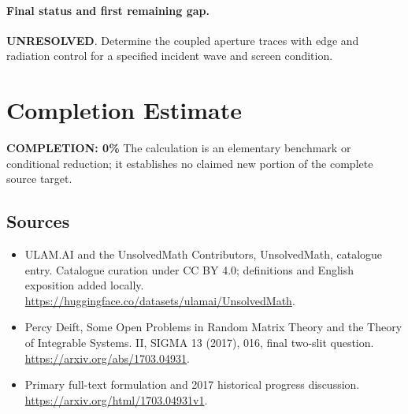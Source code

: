 \documentclass[11pt]{article}
\begin{document}
\paragraph{Final status and first remaining gap.}
\textbf{UNRESOLVED}. Determine the coupled aperture traces with edge and radiation control for a specified incident wave and screen condition.

\section{Completion Estimate}
\noindent\textbf{COMPLETION: 0\%}
The calculation is an elementary benchmark or conditional reduction; it establishes no claimed new portion of the complete source target.

\subsection{Sources}
\begin{itemize}
\item[\hypertarget{source:statement:1}{S1}] ULAM.AI and the UnsolvedMath Contributors, UnsolvedMath, catalogue entry. Catalogue curation under CC BY 4.0; definitions and English exposition added locally.
\url{https://huggingface.co/datasets/ulamai/UnsolvedMath}.
\item[\hypertarget{source:statement:2}{S2}] Percy Deift, Some Open Problems in Random Matrix Theory and the Theory of Integrable Systems. II, SIGMA 13 (2017), 016, final two-slit question.
\url{https://arxiv.org/abs/1703.04931}.
\item[\hypertarget{source:statement:3}{S3}] Primary full-text formulation and 2017 historical progress discussion.
\url{https://arxiv.org/html/1703.04931v1}.
\end{itemize}
\label{end:statement}
\end{document}
